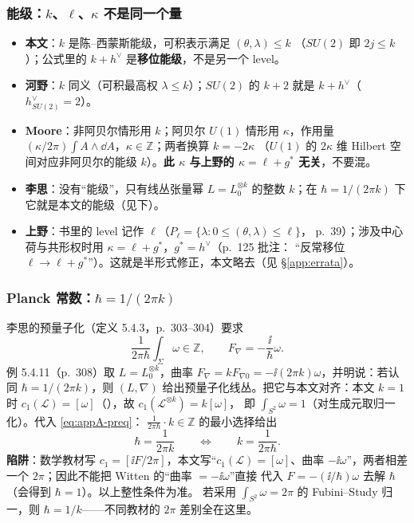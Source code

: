 \subsubsection*{能级：$k$、$\ell$、$\kappa$ 不是同一个量}

\begin{itemize}[leftmargin=1.6em]
\item \textbf{本文}：$k$ 是陈--西蒙斯能级，可积表示满足 $(\theta,\lambda)\le k$
（$SU(2)$ 即 $2j\le k$）；公式里的 $k+h^\vee$ 是\textbf{移位能级}，不是另一个 level。
\item \textbf{河野}：$k$ 同义（可积最高权 $\lambda\le k$）；$SU(2)$ 的 $k+2$ 就是
$k+h^\vee$（$h^\vee_{SU(2)}=2$）。
\item \textbf{Moore}：非阿贝尔情形用 $k$；阿贝尔 $U(1)$ 情形用 $\kappa$，作用量
$(\kappa/2\pi)\int A\wedge\dd A$，$\kappa\in\mathbb Z$；两者换算 $k=-2\kappa$
（$U(1)$ 的 $2\kappa$ 维 Hilbert 空间对应非阿贝尔的能级 $k$）。\textbf{此 $\kappa$ 与上野的
$\kappa=\ell+g^*$ 无关}，不要混。
\item \textbf{李思}：没有“能级”，只有线丛张量幂 $L=L_0^{\otimes k}$ 的整数 $k$；在
$\hbar=1/(2\pi k)$ 下它就是本文的能级（见下）。
\item \textbf{上野}：书里的 level 记作 $\ell$（$P_\ell=\{\lambda:0\le(\theta,\lambda)\le\ell\}$，
p.~39）；涉及中心荷与共形权时用 $\kappa=\ell+g^*$，$g^*=h^\vee$（p.~125 批注：
“反常移位 $\ell\to\ell+g^*$”）。这就是半形式修正，本文略去（见 \S\ref{app:errata}）。
\end{itemize}

\subsubsection*{Planck 常数：$\hbar=1/(2\pi k)$}

李思的预量子化（定义 5.4.3，p.~303--304）要求
\begin{equation}
\frac{1}{2\pi\hbar}\int_\Sigma\omega\in\mathbb Z,\qquad
F_\nabla=-\frac{\ii}{\hbar}\omega .
\label{eq:appA-preq}
\end{equation}
例 5.4.11（p.~308）取 $L=L_0^{\otimes k}$，曲率
$F_\nabla=kF_{\nabla0}=-\ii(2\pi k)\omega$，并明说：若认同
$\hbar=1/(2\pi k)$，则 $(L,\nabla)$ 给出预量子化线丛。把它与本文对齐：本文
$k=1$ 时 $c_1(\mathcal L)=[\omega]$（），故 $c_1(\mathcal L^{\otimes k})=k[\omega]$，
即 $\int_{S^2}\omega=1$（对生成元取归一化）。代入 \eqref{eq:appA-preq}：
$\frac{1}{2\pi\hbar}\cdot k\in\mathbb Z$ 的最小选择给出
\begin{equation}
\hbar=\frac{1}{2\pi k}\qquad\Longleftrightarrow\qquad k=\frac{1}{2\pi\hbar}.
\end{equation}
\textbf{陷阱}：数学教材写 $c_1=[\ii F/2\pi]$，本文写“$c_1(\mathcal L)=[\omega]$、曲率
$-\ii\omega$”，两者相差一个 $2\pi$；因此不能把 Witten 的“曲率 $=-\ii\omega$”直接
代入 $F=-(\ii/\hbar)\omega$ 去解 $\hbar$（会得到 $\hbar=1$）。以上整性条件为准。
若采用 $\int_{S^2}\omega=2\pi$ 的 Fubini--Study 归一，则 $\hbar=1/k$——不同教材的 $2\pi$
差别全在这里。

